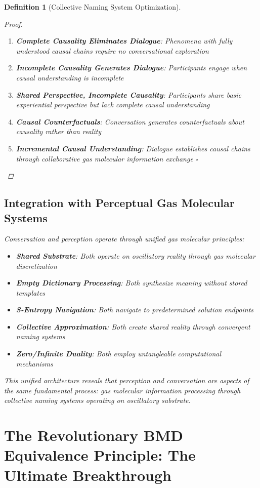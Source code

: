 \documentclass[12pt]{article}
\newtheorem{definition}{Definition}
\begin{document}
\begin{definition}[Collective Naming System Optimization]
\begin{proof}
\begin{enumerate}
\item \textbf{Complete Causality Eliminates Dialogue}: Phenomena with fully understood causal chains require no conversational exploration
\item \textbf{Incomplete Causality Generates Dialogue}: Participants engage when causal understanding is incomplete
\item \textbf{Shared Perspective, Incomplete Causality}: Participants share basic experiential perspective but lack complete causal understanding
\item \textbf{Causal Counterfactuals}: Conversation generates counterfactuals about causality rather than reality
\item \textbf{Incremental Causal Understanding}: Dialogue establishes causal chains through collaborative gas molecular information exchange $\square$
\end{enumerate}
\end{proof}

\subsection{Integration with Perceptual Gas Molecular Systems}

Conversation and perception operate through unified gas molecular principles:

\begin{itemize}
\item \textbf{Shared Substrate}: Both operate on oscillatory reality through gas molecular discretization
\item \textbf{Empty Dictionary Processing}: Both synthesize meaning without stored templates
\item \textbf{S-Entropy Navigation}: Both navigate to predetermined solution endpoints
\item \textbf{Collective Approximation}: Both create shared reality through convergent naming systems
\item \textbf{Zero/Infinite Duality}: Both employ untangleable computational mechanisms
\end{itemize}

This unified architecture reveals that perception and conversation are aspects of the same fundamental process: gas molecular information processing through collective naming systems operating on oscillatory substrate.

\section{The Revolutionary BMD Equivalence Principle: The Ultimate Breakthrough}


\end{definition}
\end{document}
